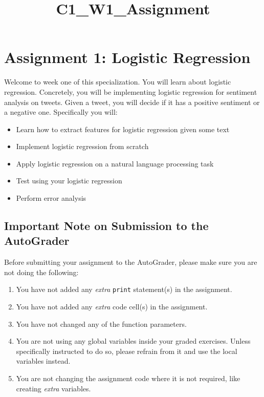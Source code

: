 \documentclass[11pt]{article}
\title{C1\_W1\_Assignment}
\providecommand{\tightlist}{%
      \setlength{\itemsep}{0pt}\setlength{\parskip}{0pt}}
\begin{document}
    
    \maketitle
    
    

    
    \hypertarget{assignment-1-logistic-regression}{%
\section{Assignment 1: Logistic
Regression}\label{assignment-1-logistic-regression}}

Welcome to week one of this specialization. You will learn about
logistic regression. Concretely, you will be implementing logistic
regression for sentiment analysis on tweets. Given a tweet, you will
decide if it has a positive sentiment or a negative one. Specifically
you will:

\begin{itemize}
\tightlist
\item
  Learn how to extract features for logistic regression given some text
\item
  Implement logistic regression from scratch
\item
  Apply logistic regression on a natural language processing task
\item
  Test using your logistic regression
\item
  Perform error analysis
\end{itemize}

\hypertarget{important-note-on-submission-to-the-autograder}{%
\subsection{Important Note on Submission to the
AutoGrader}\label{important-note-on-submission-to-the-autograder}}

Before submitting your assignment to the AutoGrader, please make sure
you are not doing the following:

\begin{enumerate}
\def\labelenumi{\arabic{enumi}.}
\tightlist
\item
  You have not added any \emph{extra} \texttt{print} statement(s) in the
  assignment.
\item
  You have not added any \emph{extra} code cell(s) in the assignment.
\item
  You have not changed any of the function parameters.
\item
  You are not using any global variables inside your graded exercises.
  Unless specifically instructed to do so, please refrain from it and
  use the local variables instead.
\item
  You are not changing the assignment code where it is not required,
  like creating \emph{extra} variables.
\end{enumerate}
\end{document}
